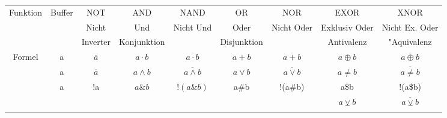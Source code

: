 \begin{table} 
\begin{tabular}{|c|c|c|c|c|c|c|c|c|}
\hline
Funktion & Buffer & NOT & AND & NAND & OR & NOR & EXOR & XNOR\\
& & Nicht & Und & Nicht Und & Oder & Nicht Oder & Exklusiv Oder & Nicht Ex. Oder\\
& & Inverter & Konjunktion & & Disjunktion & & Antivalenz & "Aquivalenz \\
\hline
Formel & a & $ \overline a $ & $ a \cdot b $ & $ \overline{a \cdot b} $ & $ a + b $ & $ \overline{a + b} $ & $ a \oplus b $ & $ \overline{a \oplus b} $\\
& a & $ \overline a $ & $ a \wedge b $ & $ \overline{a \wedge b} $ & $ a \vee b $ & $ \overline{a \vee b} $ & $ a \not= b $ & $ \overline{a \not= b} $ \\
& a & !a & $ a \& b $ & $ !(a \& b) $ & a\#b & !(a\#b) & a\$b & !(a\$b) \\
& & & & & & & $ a \veebar b $ & $ \overline{a \veebar b} $\\
\hline
& & & & & & & &\\

\end{tabular}
\end{table}
